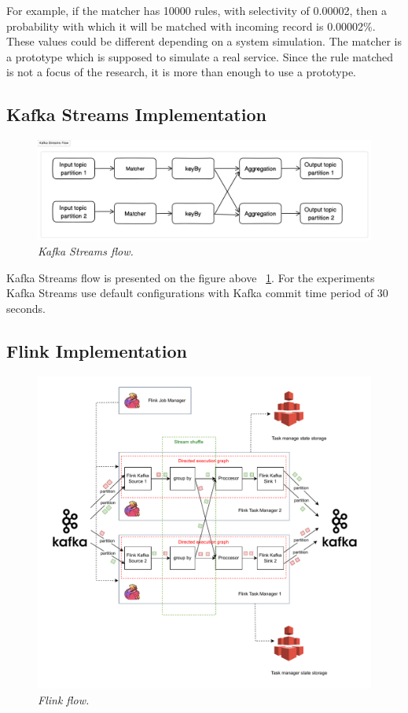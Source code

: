 For example, if the matcher has 10000 rules, with selectivity of 0.00002, then a probability with
which it will be matched with incoming record is 0.00002\%.
These values could be different depending on a system simulation.
The matcher is a prototype which is supposed to simulate a real service.
Since the rule matched is not a focus of the research, it is more than enough to use
a prototype.

\subsection{Kafka Streams Implementation}\label{subsec:kafka-streams-implementation}

\begin{figure}[H]
    \centering
    \includegraphics[width=1\textwidth]{figures/k-streams-shuffle}
    \caption{\textit{Kafka Streams flow.}}
    \label{fig:k-stream-shufle}
\end{figure}

Kafka Streams flow is presented on the figure above ~\ref{fig:k-stream-shufle}.
For the experiments Kafka Streams use default configurations with Kafka
commit time period of 30 seconds.


\subsection{Flink Implementation}\label{subsec:flink-implementation}

\begin{figure}[H]
    \centering
    \includegraphics[width=1\textwidth]{figures/flink-shuffle}
    \caption{\textit{Flink flow.}}
    \label{fig:flink-shuffle}
\end{figure}


